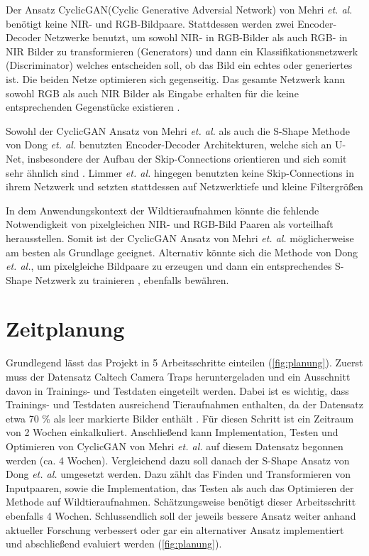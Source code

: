 \documentclass[runningheads]{llncs}
\begin{document}
Der Ansatz \glqq CyclicGAN\grqq  (Cyclic Generative Adversial Network) von Mehri \textit{et. al.} benötigt keine NIR- und RGB-Bildpaare.
Stattdessen werden zwei Encoder-Decoder Netzwerke benutzt, um sowohl NIR- in RGB-Bilder als auch RGB- in NIR Bilder zu transformieren (Generators) und 
dann ein Klassifikationsnetzwerk (Discriminator) welches entscheiden soll, ob das Bild ein echtes oder generiertes ist. Die beiden Netze optimieren sich gegenseitig.
Das gesamte Netzwerk kann sowohl RGB als auch NIR Bilder als Eingabe erhalten für die keine entsprechenden Gegenstücke existieren \cite{mehri2019colorizing}.

Sowohl der CyclicGAN Ansatz von Mehri \textit{et. al.} als auch die S-Shape Methode von Dong \textit{et. al.} benutzten Encoder-Decoder Architekturen, 
welche sich an U-Net, insbesondere der Aufbau der Skip-Connections \cite{unet} orientieren und sich somit sehr ähnlich sind \cite{dong2018infrared,mehri2019colorizing}. 
Limmer \textit{et. al.} hingegen benutzten keine Skip-Connections in ihrem Netzwerk und setzten stattdessen auf Netzwerktiefe und kleine Filtergrößen \cite{limmer2016infrared} 

In dem Anwendungskontext der Wildtieraufnahmen könnte die fehlende Notwendigkeit von pixelgleichen NIR- und RGB-Bild Paaren als vorteilhaft herausstellen.
Somit ist der CyclicGAN Ansatz von Mehri \textit{et. al.} \cite*{mehri2019colorizing} möglicherweise am besten als Grundlage geeignet. 
Alternativ könnte sich die Methode von Dong \textit{et. al.}, um pixelgleiche Bildpaare zu erzeugen und dann ein entsprechendes S-Shape Netzwerk zu trainieren \cite*{dong2018infrared}, ebenfalls bewähren.  

\section{Zeitplanung}

Grundlegend lässt das Projekt in 5 Arbeitsschritte einteilen (\autoref{fig:planung}). Zuerst muss der Datensatz Caltech Camera Traps heruntergeladen und ein Ausschnitt davon in Trainings- und Testdaten eingeteilt werden. 
Dabei ist es wichtig, dass Trainings- und Testdaten ausreichend Tieraufnahmen enthalten, da der Datensatz etwa 70 \% als leer markierte Bilder enthält \cite{caltech}. Für diesen Schritt ist ein Zeitraum von 2 Wochen einkalkuliert. 
Anschließend kann Implementation, Testen und Optimieren von CyclicGAN von Mehri \textit{et. al.} \cite*{mehri2019colorizing} auf diesem Datensatz begonnen werden (ca. 4 Wochen). 
Vergleichend dazu soll danach der S-Shape Ansatz von Dong \textit{et. al.} \cite*{dong2018infrared} umgesetzt werden. 
Dazu zählt das Finden und Transformieren von Inputpaaren, sowie die Implementation, das Testen als auch das Optimieren der Methode auf Wildtieraufnahmen. Schätzungsweise benötigt dieser Arbeitsschritt ebenfalls 4 Wochen. 
Schlussendlich soll der jeweils bessere Ansatz weiter anhand aktueller Forschung verbessert oder gar ein alternativer Ansatz implementiert und abschließend evaluiert werden (\autoref{fig:planung}).  
\end{document}
